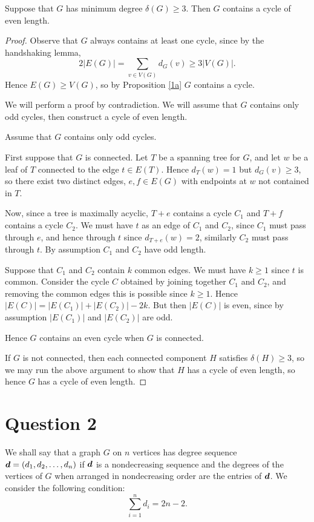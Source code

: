 \documentclass{unswmaths}
\begin{document}
\begin{proposition}
    Suppose that $G$ has minimum degree $\delta(G) \geq 3$. Then $G$ contains
    a cycle of even length.
\end{proposition}
\begin{proof}
    Observe that $G$ always contains at least one cycle, since
    by the handshaking lemma,
    \begin{equation}
        2|E(G)| = \sum_{v \in V(G)} d_G(v) \geq 3|V(G)|.
    \end{equation}
    Hence $E(G) \geq V(G)$, so by Proposition \ref{1a} $G$ contains a cycle.
    
    We will perform a proof by contradiction. We will assume that $G$ contains only
    odd cycles, then construct a cycle of even length.
    
    Assume that $G$ contains only odd cycles.
    
    First suppose that $G$ is connected. Let $T$ be a spanning tree for $G$,
    and let $w$ be a leaf of $T$ connected to the edge $t \in E(T)$. Hence $d_T(w) = 1$ but $d_G(v) \geq 3$,
    so there exist two distinct edges, $e,f \in E(G)$ with endpoints at $w$
    not contained in $T$.
    
    Now, since a tree is maximally acyclic, $T+e$ contains a cycle $C_1$
    and $T+f$ contains a cycle $C_2$. We must have $t$ as an edge of $C_1$
    and $C_2$, since $C_1$ must pass through $e$, and hence through $t$
    since $d_{T+e}(w) = 2$,
    similarly $C_2$ must pass through $t$. By assumption $C_1$
    and $C_2$ have odd length.
    
    Suppose that $C_1$ and $C_2$ contain $k$ common edges. 
    We must have $k \geq 1$ since $t$ is common.
    Consider the cycle $C$ obtained by joining together $C_1$ and $C_2$, and
    removing the common edges this is possible since $k \geq 1$. Hence $|E(C)| = |E(C_1)|+|E(C_2)|-2k$.
    But then $|E(C)|$ is even, since by assumption $|E(C_1)|$ and $|E(C_2)|$
    are odd.
    
    Hence $G$ contains an even cycle when $G$ is connected.
    
    If $G$ is not connected, then each connected component $H$
    satisfies $\delta(H) \geq 3$, so we may run the above argument
    to show that $H$ has a cycle of even length, so hence $G$
    has a cycle of even length.
   
\end{proof}

\section{Question 2}
We shall say that a graph $G$ on $n$ vertices has degree sequence $\boldsymbol{d} = (d_1,d_2,\ldots,d_n)$
if $\boldsymbol{d}$ is a nondecreasing sequence and the degrees
of the vertices of $G$ when arranged in nondecreasing order are the entries of $\boldsymbol{d}$.
We consider the following condition:
\begin{equation}\tag{*}
\label{star}
\sum_{i=1}^n d_i = 2n-2.
\end{equation}
\end{document}
